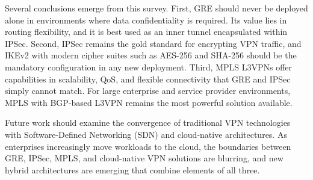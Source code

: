 \documentclass[conference]{IEEEtran}
\begin{document}
Several conclusions emerge from this survey. First, GRE should
never be deployed alone in environments where data confidentiality
is required. Its value lies in routing flexibility, and it is best
used as an inner tunnel encapsulated within IPSec. Second, IPSec
remains the gold standard for encrypting VPN traffic, and IKEv2
with modern cipher suites such as AES-256 and SHA-256 should be
the mandatory configuration in any new deployment. Third, MPLS
L3VPNs offer capabilities in scalability, QoS, and flexible
connectivity that GRE and IPSec simply cannot match. For large
enterprise and service provider environments, MPLS with
BGP-based L3VPN remains the most powerful solution available.

Future work should examine the convergence of traditional VPN
technologies with Software-Defined Networking (SDN) and
cloud-native architectures. As enterprises increasingly move
workloads to the cloud, the boundaries between GRE, IPSec, MPLS,
and cloud-native VPN solutions are blurring, and new hybrid
architectures are emerging that combine elements of all three.



\end{document}
